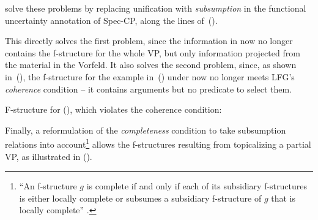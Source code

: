 \documentclass[output=paper,hidelinks]{langscibook}
\begin{document}
\citet{ZaenenKaplan2002:Subsumption} solve these problems by replacing
unification with \textit{subsumption} in the functional uncertainty
annotation of Spec-CP, along the lines of~().
%
\begin{exe}
  \ex {}
\end{exe}
%
This directly solves the first problem, since the information in
\TOPIC{} now no longer contains the f-structure for the whole VP, but
only information projected from the material in the Vorfeld. It also
solves the second problem, since, as shown in~(), the f-structure for
the example in~() under \TOPIC{} now no longer meets LFG's \textit{coherence} condition
-- it contains arguments but no predicate to select them.
\newpage
\begin{exe}
  \ex F-structure for (), which violates the coherence condition:\\[.5ex]
\end{exe}
%
Finally, a reformulation of the \textit{completeness} condition to
take subsumption relations into account\footnote{``An f-structure $g$
is complete if and only if each of its subsidiary f-structures is
either locally complete or subsumes a subsidiary f-structure of $g$
that is locally complete'' \citep[{[24]}]{ZaenenKaplan2002:Subsumption}.}
allows the f-structures resulting from topicalizing a partial VP, as
illustrated in ().
%
\end{document}
